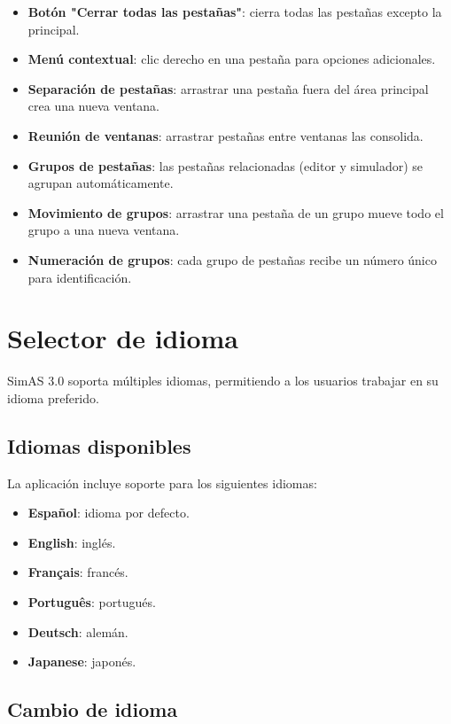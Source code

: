 \begin{itemize}
    \item \textbf{Botón \string"Cerrar todas las pestañas\string"}: cierra todas las pestañas excepto la principal.
    \item \textbf{Menú contextual}: clic derecho en una pestaña para opciones adicionales.
    \item \textbf{Separación de pestañas}: arrastrar una pestaña fuera del área principal crea una nueva ventana.
    \item \textbf{Reunión de ventanas}: arrastrar pestañas entre ventanas las consolida.
    \item \textbf{Grupos de pestañas}: las pestañas relacionadas (editor y simulador) se agrupan automáticamente.
    \item \textbf{Movimiento de grupos}: arrastrar una pestaña de un grupo mueve todo el grupo a una nueva ventana.
    \item \textbf{Numeración de grupos}: cada grupo de pestañas recibe un número único para identificación.
\end{itemize}

\section{Selector de idioma}

SimAS 3.0 soporta múltiples idiomas, permitiendo a los usuarios trabajar en su idioma preferido.

\subsection{Idiomas disponibles}

La aplicación incluye soporte para los siguientes idiomas:

\begin{itemize}
    \item \textbf{Español}: idioma por defecto.
    \item \textbf{English}: inglés.
    \item \textbf{Français}: francés.
    \item \textbf{Português}: portugués.
    \item \textbf{Deutsch}: alemán.
    \item \textbf{Japanese}: japonés.
\end{itemize}

\subsection{Cambio de idioma}

